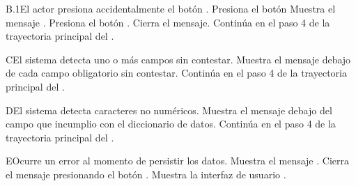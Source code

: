 \begin{UCtrayectoriaA}{B.1}{El actor presiona accidentalmente el botón .}
	\UCpaso[\UCactor] Presiona el botón 
	\UCpaso Muestra el mensaje .
	\UCpaso[\UCactor] Presiona el botón .
	\UCpaso Cierra el mensaje.
	\UCpaso Continúa en el paso 4 de la trayectoria principal del .
\end{UCtrayectoriaA}

\begin{UCtrayectoriaA}{C}{El sistema detecta uno o más campos sin contestar.}
	\UCpaso Muestra el mensaje  debajo de cada campo obligatorio sin contestar.
	\UCpaso Continúa en el paso 4 de la trayectoria principal del .
\end{UCtrayectoriaA}

\begin{UCtrayectoriaA}{D}{El sistema detecta caracteres no numéricos.}
	\UCpaso Muestra el mensaje  debajo del campo que incumplio con el diccionario de datos.
	\UCpaso Continúa en el paso 4 de la trayectoria principal del .
\end{UCtrayectoriaA}

\begin{UCtrayectoriaA}{E}{Ocurre un error al momento de persistir los datos.}
	\UCpaso Muestra el mensaje .
	\UCpaso[\UCactor] Cierra el mensaje presionando el botón .
	\UCpaso Muestra la interfaz de usuario .
\end{UCtrayectoriaA}


